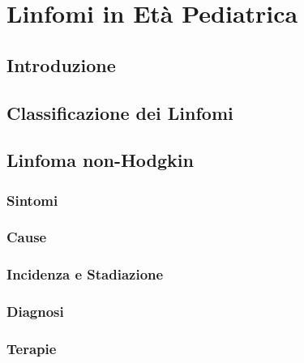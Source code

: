 \chapter{Linfomi in Età Pediatrica}

\section{Introduzione}
\section{Classificazione dei Linfomi}
\section{Linfoma non-Hodgkin}
\subsection{Sintomi}
\subsection{Cause}
\subsection{Incidenza e Stadiazione}
\subsection{Diagnosi}
\subsection{Terapie}